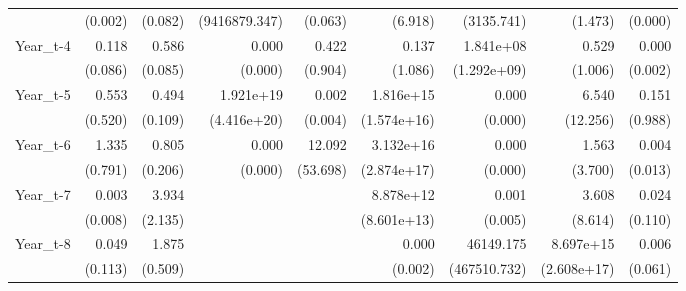 \begin{table}[htbp]
\begin{tabular}{l*{8}{D{.}{.}{-1}}}
                    &     (0.002)         &     (0.082)         &(9416879.347)         &     (0.063)         &     (6.918)         &  (3135.741)         &     (1.473)         &     (0.000)         \\
Year\_t-4            &       0.118\sym{***}&       0.586\sym{***}&       0.000         &       0.422         &       0.137         &   1.841e+08\sym{***}&       0.529         &       0.000         \\
                    &     (0.086)         &     (0.085)         &     (0.000)         &     (0.904)         &     (1.086)         & (1.292e+09)         &     (1.006)         &     (0.002)         \\
Year\_t-5            &       0.553         &       0.494\sym{***}&   1.921e+19\sym{*}  &       0.002\sym{***}&   1.816e+15\sym{***}&       0.000\sym{***}&       6.540         &       0.151         \\
                    &     (0.520)         &     (0.109)         & (4.416e+20)         &     (0.004)         & (1.574e+16)         &     (0.000)         &    (12.256)         &     (0.988)         \\
Year\_t-6            &       1.335         &       0.805         &       0.000         &      12.092         &   3.132e+16\sym{***}&       0.000\sym{**} &       1.563         &       0.004\sym{\%}  \\
                    &     (0.791)         &     (0.206)         &     (0.000)         &    (53.698)         & (2.874e+17)         &     (0.000)         &     (3.700)         &     (0.013)         \\
Year\_t-7            &       0.003\sym{**} &       3.934\sym{**} &                     &                     &   8.878e+12\sym{***}&       0.001\sym{\%}  &       3.608         &       0.024         \\
                    &     (0.008)         &     (2.135)         &                     &                     & (8.601e+13)         &     (0.005)         &     (8.614)         &     (0.110)         \\
Year\_t-8            &       0.049         &       1.875\sym{**} &                     &                     &       0.000         &   46149.175         &   8.697e+15         &       0.006         \\
                    &     (0.113)         &     (0.509)         &                     &                     &     (0.002)         &(467510.732)         & (2.608e+17)         &     (0.061)         \\

\end{tabular}
\end{table}
